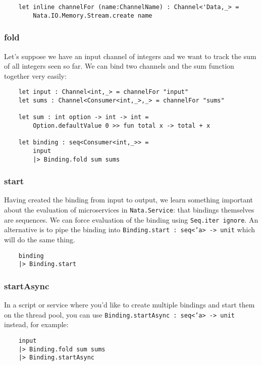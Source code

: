 \documentclass{article}
\begin{document}
\begin{verbatim}
    let inline channelFor (name:ChannelName) : Channel<'Data,_> =
        Nata.IO.Memory.Stream.create name
\end{verbatim}

\subsubsection{fold}

Let's suppose we have an input channel of integers and we want to track the sum of all integers seen so far.  We can bind two channels and the sum function together very easily:

\begin{verbatim}
    let input : Channel<int,_> = channelFor "input"
    let sums : Channel<Consumer<int,_>,_> = channelFor "sums"

    let sum : int option -> int -> int =
        Option.defaultValue 0 >> fun total x -> total + x
    
    let binding : seq<Consumer<int,_>> =
        input
        |> Binding.fold sum sums
\end{verbatim}

\subsubsection{start}

Having created the binding from input to output, we learn something important about the evaluation of microservices in \texttt{Nata.Service}: that bindings themselves are sequences.  We can force evaluation of the binding using \texttt{Seq.iter ignore}.  An alternative is to pipe the binding into \texttt{Binding.start : seq<'a> -> unit} which will do the same thing. 

\begin{verbatim}
    binding
    |> Binding.start
\end{verbatim}

\subsubsection{startAsync}

In a script or service where you'd like to create multiple bindings and start them on the thread pool, you can use \texttt{Binding.startAsync : seq<'a> -> unit} instead, for example:

\begin{verbatim}
    input
    |> Binding.fold sum sums
    |> Binding.startAsync
\end{verbatim}
\end{document}
